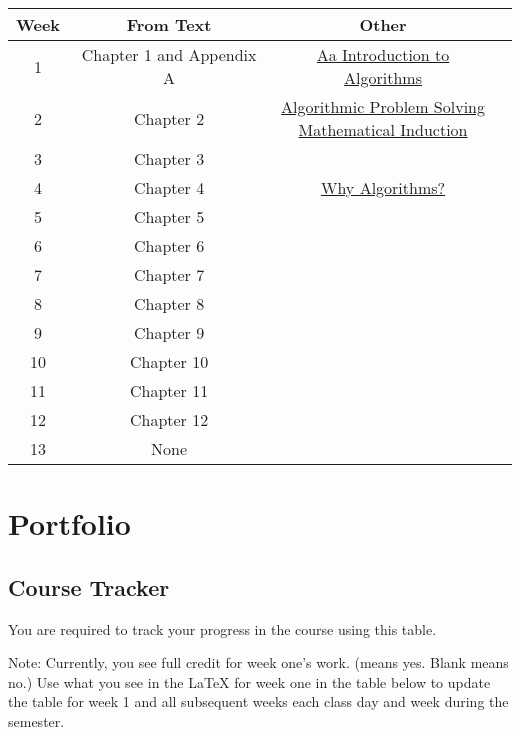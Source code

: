 \documentclass[12pt]{amsart}
\begin{document}
\begin{table}[ht]
\begin{center}
\begin{tabular}{|c|c|c|c|}
	\hline
   \rowcolor[gray]{.9}
	Week & From Text & Other \\
	\hline
	 1 & Chapter 1 and Appendix A & \href{https://byui-cse.github.io/cse381-course/support_files/alg_intro.pdf}{Aa Introduction to Algorithms}\\
	\hline
	 2 & Chapter 2 & \makecell{
	\href{https://byui-cse.github.io/cse381-course/support_files/aps.pdf}{Algorithmic Problem Solving}\\
	\href{https://byui-cse.github.io/cse381-course/support_files/Induction.pdf}{Mathematical Induction}}\\ 
	\hline
	3 & Chapter 3 &\\
	\hline
	4 & Chapter 4 &\href{https://developer.apple.com/videos/play/wwdc2018/223/}{Why Algorithms?}\\
	\hline
	5 & Chapter 5 &\\
	\hline
	6 & Chapter 6 &\\
	\hline
	7 & Chapter 7 &\\
	\hline
	8 & Chapter 8 &\\
	\hline
	9 & Chapter 9 &\\
	\hline
	10 & Chapter 10 &\\
	\hline
	11 & Chapter 11 &\\
	\hline
	12 & Chapter 12 &\\
	\hline
	13 & None &\\
	\hline
\end{tabular}
\end{center}
\end{table}
\newpage
\section{Portfolio}
\subsection{Course Tracker}

You are required to track your progress in the course using this table. 

Note: Currently, you see full credit for week one's work. (\checkmark means yes. Blank means no.) Use what you see in the \LaTeX{} for week one in the table below to update the table for week 1 and all subsequent weeks each class day and week during the semester.
\end{document}
